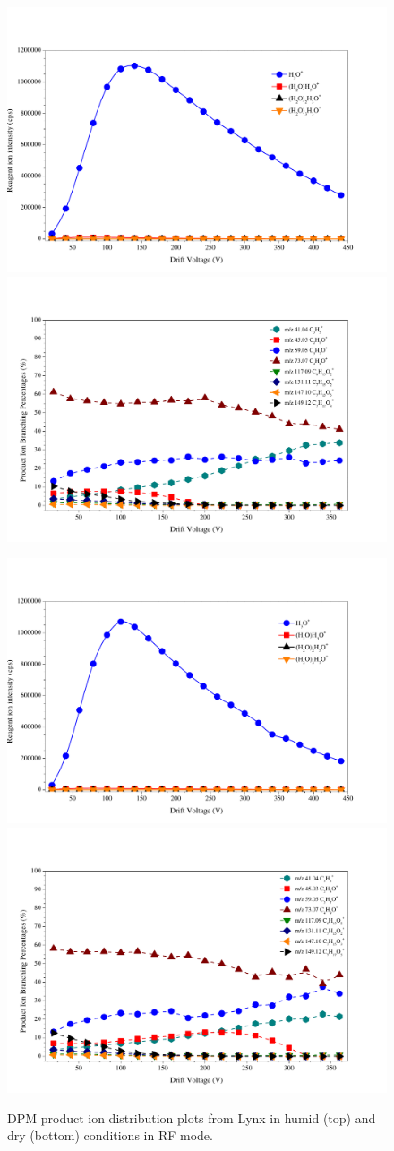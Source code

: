 \begin{figure}%
\centering
\includegraphics[width=0.48\linewidth]{pics/DPM_clusters_humid_RF.pdf}
\includegraphics[width=0.48\linewidth]{pics/DPM_humid_RF.pdf}

\includegraphics[width=0.48\linewidth]{pics/DPM_clusters_dry_RF.pdf}
\includegraphics[width=0.48\linewidth]{pics/DPM_dry_RF.pdf}
\caption{DPM product ion distribution plots from Lynx in humid (top) and  dry (bottom) conditions in RF mode.}
\label{dpm2}
\end{figure}












